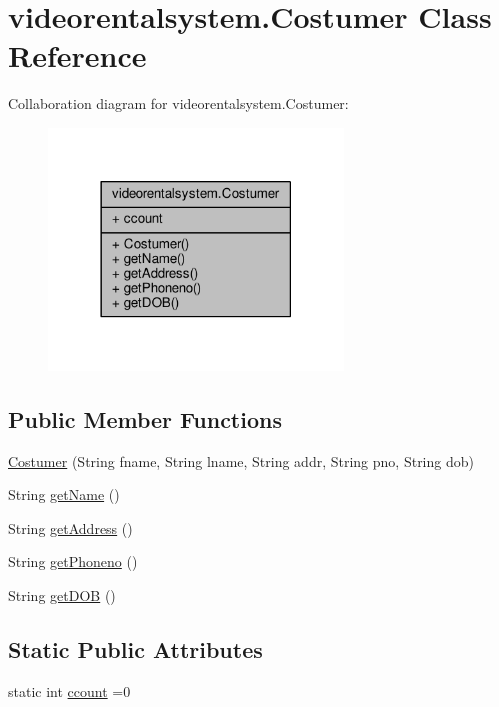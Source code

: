 \hypertarget{classvideorentalsystem_1_1Costumer}{\section{videorentalsystem.\-Costumer Class Reference}
\label{classvideorentalsystem_1_1Costumer}
}


Collaboration diagram for videorentalsystem.\-Costumer\-:
\nopagebreak
\begin{figure}[H]
\begin{center}
\leavevmode
\includegraphics[width=222pt]{classvideorentalsystem_1_1Costumer__coll__graph}
\end{center}
\end{figure}
\subsection*{Public Member Functions}
\begin{DoxyCompactItemize}
\item 
\hyperlink{classvideorentalsystem_1_1Costumer_ab14784dcbcc0666a52028443cd5f8b4b}{Costumer} (String fname, String lname, String addr, String pno, String dob)
\item 
String \hyperlink{classvideorentalsystem_1_1Costumer_a7b5e9acd8cc041d5a41e8a6c5ae37b4c}{get\-Name} ()
\item 
String \hyperlink{classvideorentalsystem_1_1Costumer_af7955a56dc3398d6a7a1070b9a662f12}{get\-Address} ()
\item 
String \hyperlink{classvideorentalsystem_1_1Costumer_a21333c82e17dbfa6bab0dc41c343b356}{get\-Phoneno} ()
\item 
String \hyperlink{classvideorentalsystem_1_1Costumer_a7eb6bb7a7bf8601be08c336023d54bd3}{get\-D\-O\-B} ()
\end{DoxyCompactItemize}
\subsection*{Static Public Attributes}
\begin{DoxyCompactItemize}
\item 
static int \hyperlink{classvideorentalsystem_1_1Costumer_a8f4a5d4db773d971fad7a717a964f2ad}{ccount} =0
\end{DoxyCompactItemize}



